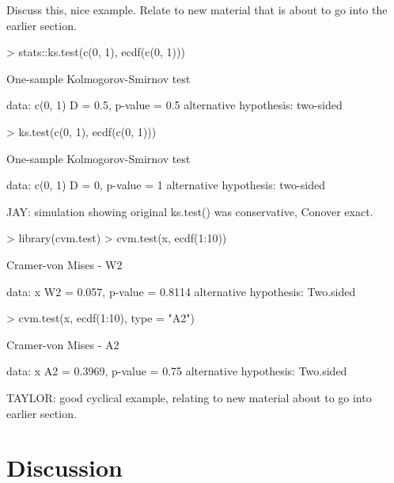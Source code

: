 Discuss this, nice example.  Relate to new material that is about to go into
the earlier section.
\begin{Schunk}
\begin{Sinput}
> stats::ks.test(c(0, 1), ecdf(c(0, 1)))
\end{Sinput}
\begin{Soutput}
	One-sample Kolmogorov-Smirnov test

data:  c(0, 1) 
D = 0.5, p-value = 0.5
alternative hypothesis: two-sided 
\end{Soutput}
\begin{Sinput}
> ks.test(c(0, 1), ecdf(c(0, 1)))
\end{Sinput}
\begin{Soutput}
	One-sample Kolmogorov-Smirnov test

data:  c(0, 1) 
D = 0, p-value = 1
alternative hypothesis: two-sided 
\end{Soutput}
\end{Schunk}

JAY: simulation showing original ks.test() was conservative, Conover exact.

\begin{Schunk}
\begin{Sinput}
> library(cvm.test)
> cvm.test(x, ecdf(1:10))
\end{Sinput}
\begin{Soutput}
	Cramer-von Mises - W2

data:  x 
W2 = 0.057, p-value = 0.8114
alternative hypothesis: Two.sided 
\end{Soutput}
\begin{Sinput}
> cvm.test(x, ecdf(1:10), type = "A2")
\end{Sinput}
\begin{Soutput}
	Cramer-von Mises - A2

data:  x 
A2 = 0.3969, p-value = 0.75
alternative hypothesis: Two.sided 
\end{Soutput}
\end{Schunk}

TAYLOR: good cyclical example, relating to new material about to go into
earlier section.


\section{Discussion}

